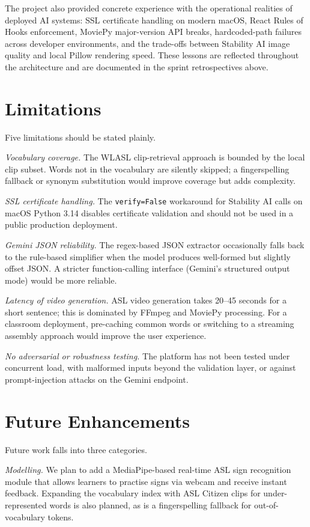 \documentclass[12pt,a4paper,oneside]{report}
\begin{document}
The project also provided concrete experience with the operational realities of deployed AI systems: SSL certificate handling on modern macOS, React Rules of Hooks enforcement, MoviePy major-version API breaks, hardcoded-path failures across developer environments, and the trade-offs between Stability AI image quality and local Pillow rendering speed. These lessons are reflected throughout the architecture and are documented in the sprint retrospectives above.

\section{Limitations}

Five limitations should be stated plainly.

\textit{Vocabulary coverage.} The WLASL clip-retrieval approach is bounded by the local clip subset. Words not in the vocabulary are silently skipped; a fingerspelling fallback or synonym substitution would improve coverage but adds complexity.

\textit{SSL certificate handling.} The \texttt{verify=False} workaround for Stability AI calls on macOS Python 3.14 disables certificate validation and should not be used in a public production deployment.

\textit{Gemini JSON reliability.} The regex-based JSON extractor occasionally falls back to the rule-based simplifier when the model produces well-formed but slightly offset JSON. A stricter function-calling interface (Gemini's structured output mode) would be more reliable.

\textit{Latency of video generation.} ASL video generation takes 20--45 seconds for a short sentence; this is dominated by FFmpeg and MoviePy processing. For a classroom deployment, pre-caching common words or switching to a streaming assembly approach would improve the user experience.

\textit{No adversarial or robustness testing.} The platform has not been tested under concurrent load, with malformed inputs beyond the validation layer, or against prompt-injection attacks on the Gemini endpoint.

\section{Future Enhancements}

Future work falls into three categories.

\textit{Modelling.} We plan to add a MediaPipe-based real-time ASL sign recognition module that allows learners to practise signs via webcam and receive instant feedback. Expanding the vocabulary index with ASL Citizen \cite{desai2023aslcitizen} clips for under-represented words is also planned, as is a fingerspelling fallback for out-of-vocabulary tokens.
\end{document}
